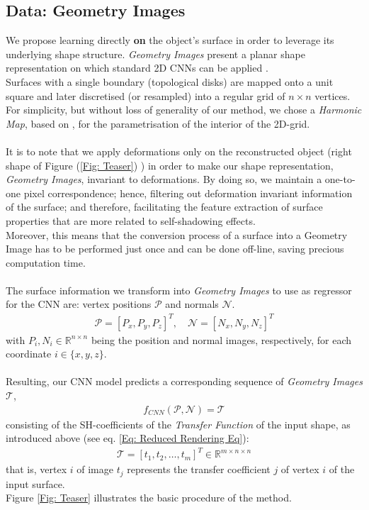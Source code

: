 \subsection{Data: Geometry Images}
We propose learning directly \textbf{on} the object's surface in order to leverage its underlying shape structure. \textit{Geometry Images} present a planar shape representation on which standard 2D CNNs can be applied \cite{gu2002geometry, sinha2016deep}. 
\\ 
Surfaces with a single boundary (topological disks) are mapped onto a unit square and later discretised (or resampled) into a regular grid of $n \times n$ vertices. 
For simplicity, but without loss of generality of our method, we  chose a \textit{Harmonic Map}, based on \cite{HM_book, HarmonicMapping}, for the parametrisation of the interior of the 2D-grid. \\
\\
It is to note that we apply deformations only on the reconstructed object (right shape of Figure (\ref{Fig: Teaser}) ) in order to make our shape representation, \textit{Geometry Images}, invariant to deformations. By doing so, we maintain a one-to-one pixel correspondence; hence, filtering out deformation invariant information of the surface; and therefore, facilitating the feature extraction of surface properties that are more related to self-shadowing effects. 
\\
Moreover, this means that the conversion process of a surface into a Geometry Image has to be performed just once and can be done off-line, saving precious computation time.\\
\\
The surface information we transform into \textit{Geometry Images} to use as regressor for the CNN are: vertex positions $\mathcal{P}$ and normals $\mathcal{N}$. 
\begin{align*}
	\mathcal{P} = [ P_x, P_y, P_z ]^T , \quad
	\mathcal{N} = [ N_x, N_y, N_z ] ^T 
\end{align*}
with  $P_i, N_i \in \mathbb{R}^{n \times n }$ being the position and normal images, respectively, for each coordinate $i \in \{ x,y,z\}$.
\\
\\
Resulting, our CNN model predicts a corresponding sequence of \textit{Geometry Images} $\mathcal{T}$,
\begin{align*}
	f_{CNN} (  \mathcal{P} , \mathcal{N} ) = \mathcal{T} 
\end{align*}
consisting of the SH-coefficients of the \textit{Transfer Function} of the input shape, as introduced above (see eq. \ref{Eq: Reduced Rendering Eq}):
\begin{align*}
	\mathcal{T} = [ t_1, t_2, \dots, t_m ]^T \in \mathbb{R}^{m \times n \times n} 
\end{align*}
that is, vertex $i$ of image $t_j$ represents the transfer coefficient $j$ of vertex $i$ of the input surface.
\\
Figure \ref{Fig: Teaser} illustrates the basic procedure of the method.

